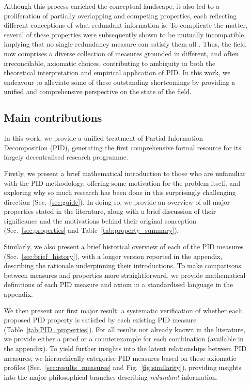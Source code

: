 \documentclass{article}
\begin{document}
Although this process enriched the conceptual landscape, it also led to a proliferation of partially overlapping and competing properties, each reflecting different conceptions of what redundant information is. To complicate the matter, several of these properties were subsequently shown to be mutually incompatible, implying that no single redundancy measure can satisfy them all \cite{rauh2014reconsidering}. Thus, the field now comprises a diverse collection of measures grounded in different, and often irreconcilable, axiomatic choices, contributing to ambiguity in both the theoretical interpretation and empirical application of PID.  In this work, we endeavour to alleviate some of these outstanding shortcomings by providing a unified and comprehensive perspective on the state of the field. 


\subsection{Main contributions}
In this work, we provide a unified treatment of Partial Information Decomposition (PID), generating the first comprehensive formal resource for its largely decentralised research programme. 

Firstly, we present a brief mathematical introduction to those who are unfamiliar with the PID methodology, offering some motivation for the problem itself, and exploring why so much research has been done in this surprisingly challenging direction (Sec.~\ref{sec:guide}). 
In doing so, we provide an overview of all major properties stated in the literature, along with a brief discussion of their significance and the motivations behind their original conception (Sec.~\ref{sec:properties} and Table~\ref{tab:property_summary}).

Similarly, we also present a brief historical overview of each of the PID measures (Sec.~\ref{sec:brief_history}), with a longer version reported in the appendix, describing the rationale underpinning their introductions. 
To make comparisons between measures and properties more straightforward, we provide mathematical definitions of each PID measure and axiom in a standardised language in the appendix.

We then present our first major result: a systematic verification of whether each proposed PID property is satisfied by each existing PID measure (Table~\ref{tab:PID_properties}). For all results not already known in the literature, we provide either a proof or a counterexample for each combination (available in the appendix).
To yield further insights into the latent relationships between PID measures, we hierarchically categorise PID measures based on these axiomatic profiles (Sec.~\ref{sec:results_measures} and Fig.~\ref{fig:similarity}), providing insights into the major philosophical branches describing \textit{redundant} information.
\end{document}

